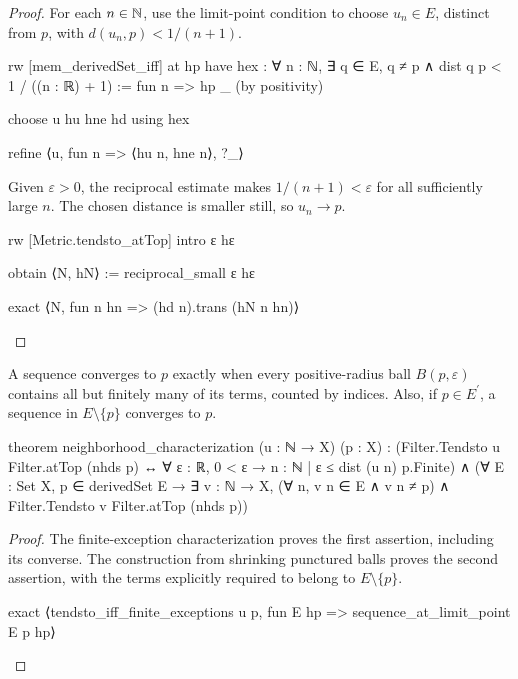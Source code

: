 \begin{proof}
  For each $n\in\mathbb{N}$, use the limit-point condition to choose $u_n\in E$, distinct from $p$, with
  $d(u_n,p)<1/(n+1)$.

  \begin{lean}
    rw [mem_derivedSet_iff] at hp
    have hex : ∀ n : ℕ, ∃ q ∈ E, q ≠ p ∧ dist q p < 1 / ((n : ℝ) + 1) :=
      fun n => hp _ (by positivity)

    choose u hu hne hd using hex

    refine ⟨u, fun n => ⟨hu n, hne n⟩, ?_⟩
  \end{lean}

  Given $\varepsilon>0$, the reciprocal estimate makes $1/(n+1)<\varepsilon$ for all sufficiently
  large $n$.
  The chosen distance is smaller still, so $u_n\to p$.

  \begin{lean}
    rw [Metric.tendsto_atTop]
    intro ε hε

    obtain ⟨N, hN⟩ := reciprocal_small ε hε

    exact ⟨N, fun n hn => (hd n).trans (hN n hn)⟩
  \end{lean}

\end{proof}

\begin{theorem}
  \label{an1:thm:neighborhood}
  A sequence converges to $p$ exactly when every positive-radius ball $B(p,\varepsilon)$ contains
  all but finitely many of its terms, counted by indices.
  Also, if $p\in E^{\prime}$, a sequence in $E\setminus\{p\}$ converges to $p$.

  \begin{lean}
    theorem neighborhood_characterization (u : ℕ → X) (p : X) :
        (Filter.Tendsto u Filter.atTop (nhds p) ↔ ∀ ε : ℝ, 0 < ε → {n : ℕ | ε ≤ dist (u n) p}.Finite) ∧
        (∀ E : Set X, p ∈ derivedSet E →
          ∃ v : ℕ → X, (∀ n, v n ∈ E ∧ v n ≠ p) ∧ Filter.Tendsto v Filter.atTop (nhds p))
  \end{lean}
\end{theorem}

\begin{proof}
  The finite-exception characterization proves the first assertion, including its converse.
  The construction from shrinking punctured balls proves the second assertion, with the terms
  explicitly required to belong to $E\setminus\{p\}$.

  \begin{lean}
    exact ⟨tendsto_iff_finite_exceptions u p, fun E hp => sequence_at_limit_point E p hp⟩
  \end{lean}

\end{proof}
